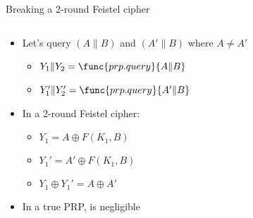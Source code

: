\documentclass[aspectratio=169, lualatex, handout]{beamer}
\begin{document}
\begin{frame}{Breaking a 2-round Feistel cipher}
	\begin{columns}[c]
		\begin{column}{0.4\textwidth}
			\begin{itemize}[<+->]
				\item Let's query $(A \| B)$ and $(A' \| B)$ where $A \neq A'$
				      \begin{itemize}
					      \item $Y_1 \| Y_2 = \func{prp.query}{A \| B}$
					      \item $Y_1' \| Y_2' = \func{prp.query}{A' \| B}$
				      \end{itemize}
				\item In a 2-round Feistel cipher:
				      \begin{itemize}
					      \item $Y_1 = A \oplus F(K_1, B)$
					      \item $Y_1' = A' \oplus F(K_1, B)$
					      \item $Y_1 \oplus Y_1' = A \oplus A'$
				      \end{itemize}
				\item In a true PRP,  is negligible
			\end{itemize}
		\end{column}
		\begin{column}{0.6\textwidth}
			\begin{center}
			\end{center}
		\end{column}
	\end{columns}
\end{frame}
\end{document}
